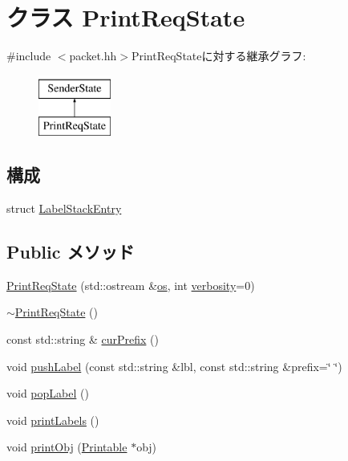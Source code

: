 \hypertarget{classPacket_1_1PrintReqState}{
\section{クラス PrintReqState}
\label{classPacket_1_1PrintReqState}
}


{\ttfamily \#include $<$packet.hh$>$}PrintReqStateに対する継承グラフ:\begin{figure}[H]
\begin{center}
\leavevmode
\includegraphics[height=2cm]{classPacket_1_1PrintReqState}
\end{center}
\end{figure}
\subsection*{構成}
\begin{DoxyCompactItemize}
\item 
struct \hyperlink{structPacket_1_1PrintReqState_1_1LabelStackEntry}{LabelStackEntry}
\end{DoxyCompactItemize}
\subsection*{Public メソッド}
\begin{DoxyCompactItemize}
\item 
\hyperlink{classPacket_1_1PrintReqState_a2e853be0fa1049895136c8bfae01446f}{PrintReqState} (std::ostream \&\hyperlink{classPacket_1_1PrintReqState_a1a917786b846a8a836dd09f6970db62a}{os}, int \hyperlink{classPacket_1_1PrintReqState_ae2bc69d2191ab7552502f23bee9f8295}{verbosity}=0)
\item 
\hyperlink{classPacket_1_1PrintReqState_ac45cb047672396b55a3e6a96415c4f61}{$\sim$PrintReqState} ()
\item 
const std::string \& \hyperlink{classPacket_1_1PrintReqState_ad5d5a6a6da677a4961b84d82bbe05153}{curPrefix} ()
\item 
void \hyperlink{classPacket_1_1PrintReqState_a41a5d865ff796adb9576e663888d1b6a}{pushLabel} (const std::string \&lbl, const std::string \&prefix=\char`\"{}  \char`\"{})
\item 
void \hyperlink{classPacket_1_1PrintReqState_a3ab6da7065be0d85f45a8dd050515f16}{popLabel} ()
\item 
void \hyperlink{classPacket_1_1PrintReqState_afbf1f814881d73eefde6bccdde641db8}{printLabels} ()
\item 
void \hyperlink{classPacket_1_1PrintReqState_a943819fd659ba72526301cffe5479ed9}{printObj} (\hyperlink{classPrintable}{Printable} $\ast$obj)
\end{DoxyCompactItemize}
